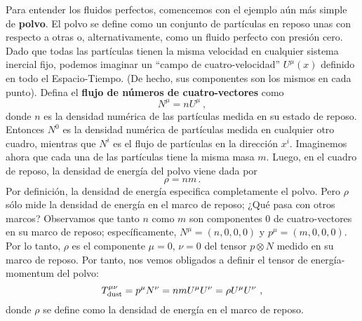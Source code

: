 \documentclass[11pt,b5paper,openany,twoside]{book}
\newcommand{\mn}{{\mu\nu}}
\begin{document}
Para entender los fluidos perfectos, comencemos con el ejemplo aún más simple de {\bf polvo}.
El polvo se define como un conjunto de partículas en reposo unas con respecto a otras o, alternativamente, como un fluido perfecto con presión cero.
Dado que todas las partículas tienen la misma velocidad en cualquier sistema inercial fijo, podemos imaginar un ``campo de cuatro-velocidad'' $U^\mu(x)$ definido en todo el Espacio-Tiempo.
(De hecho, sus componentes son los mismos en cada punto).
Defina el {\bf flujo de números de cuatro-vectores} como
\begin{equation}
N^\mu = n U^\mu\ ,\label{1.104}
\end{equation}
donde $n$ es la densidad numérica de las partículas medida en su estado de reposo.
Entonces $N^0$ es la densidad numérica de partículas medida en cualquier otro cuadro, mientras que $N^i$ es el flujo de partículas en la dirección $x^i$.
Imaginemos ahora que cada una de las partículas tiene la misma masa $m$.
Luego, en el cuadro de reposo, la densidad de energía del polvo viene dada por
\begin{equation}
\rho = nm\,.\label{1.105}
\end{equation}
Por definición, la densidad de energía especifica completamente el polvo.
Pero $\rho$ sólo mide la densidad de energía en el marco de reposo; ¿Qué pasa con otros marcos? Observamos que tanto $n$ como $m$ son componentes $0$ de cuatro-vectores en su marco de reposo; específicamente, $N^\mu = (n,0,0,0)$ y $p^\mu = (m,0,0,0)$.
Por lo tanto, $\rho$ es el componente $\mu = 0$, $\nu =0$ del tensor $p\otimes N$ medido en su marco de reposo.
Por tanto, nos vemos obligados a definir el tensor de energía-momentum del polvo:
\begin{equation}
T^\mn_{\rm dust} = p^\mu N^\nu = nm U^\mu U^\nu = \rho U^\mu U^\nu
\ ,\label{1.106}
\end{equation}
donde $\rho$ se define como la densidad de energía en el marco de reposo.
\end{document}
